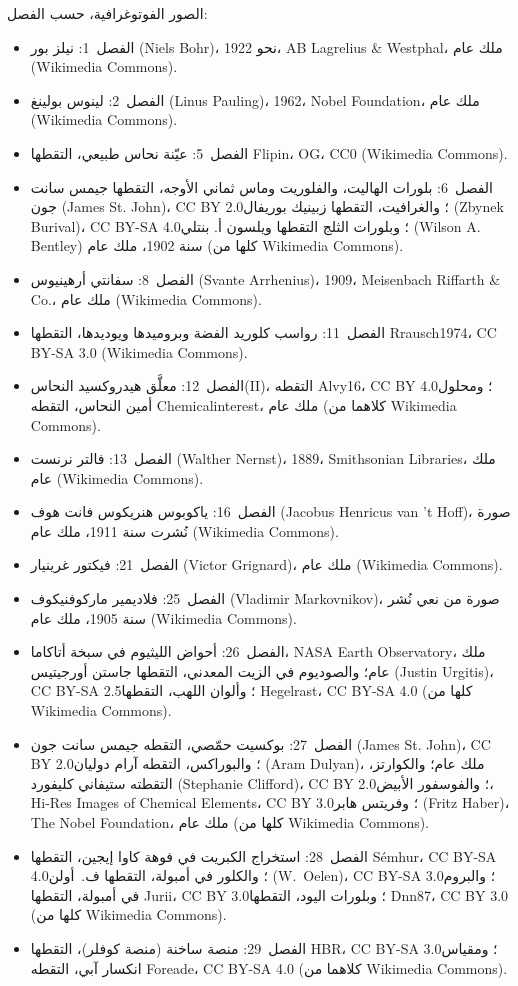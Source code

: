 \bigskip
\noindent الصور الفوتوغرافية، حسب الفصل:
\begin{itemize}\small
  \item الفصل~1: نيلز بور (Niels Bohr)، نحو 1922، AB Lagrelius \& Westphal، ملك عام
        (Wikimedia Commons).
  \item الفصل~2: لينوس بولينغ (Linus Pauling)، 1962، Nobel Foundation، ملك عام
        (Wikimedia Commons).
  \item الفصل~5: عيّنة نحاس طبيعي، التقطها Flipin، OG، CC0 (Wikimedia
        Commons).
  \item الفصل~6: بلورات الهاليت، والفلوريت وماس ثماني الأوجه، التقطها
        جيمس سانت جون (James St. John)، CC BY 2.0؛ والغرافيت، التقطها زبينيك بوريفال
        (Zbynek Burival)، CC BY-SA 4.0؛ وبلورات الثلج التقطها ويلسون أ. بنتلي
        (Wilson A. Bentley) سنة 1902، ملك عام (كلها من Wikimedia Commons).
  \item الفصل~8: سفانتي أرهينيوس (Svante Arrhenius)، 1909، Meisenbach Riffarth \& Co.، ملك
        عام (Wikimedia Commons).
  \item الفصل~11: رواسب كلوريد الفضة وبروميدها ويوديدها، التقطها
        Rrausch1974، CC BY-SA 3.0 (Wikimedia Commons).
  \item الفصل~12: معلَّق هيدروكسيد النحاس(II)، التقطه Alvy16، CC BY 4.0؛
        ومحلول أمين النحاس، التقطه Chemicalinterest، ملك عام (كلاهما من
        Wikimedia Commons).
  \item الفصل~13: فالتر نرنست (Walther Nernst)، 1889، Smithsonian Libraries، ملك عام
        (Wikimedia Commons).
  \item الفصل~16: ياكوبوس هنريكوس فانت هوف (Jacobus Henricus van 't Hoff)، صورة نُشرت سنة 1911،
        ملك عام (Wikimedia Commons).
  \item الفصل~21: فيكتور غرينيار (Victor Grignard)، ملك عام (Wikimedia Commons).
  \item الفصل~25: فلاديمير ماركوفنيكوف (Vladimir Markovnikov)، صورة من نعي
        نُشر سنة 1905، ملك عام (Wikimedia Commons).
  \item الفصل~26: أحواض الليثيوم في سبخة أتاكاما، NASA Earth
        Observatory، ملك عام؛ والصوديوم في الزيت المعدني، التقطها جاستن أورجيتيس (Justin Urgitis)،
        CC BY-SA 2.5؛ وألوان اللهب، التقطها Hegelrast، CC BY-SA 4.0 (كلها من
        Wikimedia Commons).
  \item الفصل~27: بوكسيت حمّصي، التقطه جيمس سانت جون (James St. John)، CC BY 2.0؛ والبوراكس، التقطه
        آرام دوليان (Aram Dulyan)، ملك عام؛ والكوارتز، التقطته ستيفاني كليفورد (Stephanie Clifford)، CC BY 2.0؛
        والفوسفور الأبيض، Hi-Res Images of Chemical Elements، CC BY 3.0؛
        وفريتس هابر (Fritz Haber)، The Nobel Foundation، ملك عام (كلها من Wikimedia
        Commons).
  \item الفصل~28: استخراج الكبريت في فوهة كاوا إيجين، التقطها Sémhur،
        CC BY-SA 4.0؛ والكلور في أمبولة، التقطها ف.~أولن (W.~Oelen)، CC BY-SA 3.0؛
        والبروم في أمبولة، التقطها Jurii، CC BY 3.0؛ وبلورات اليود، التقطها
        Dnn87، CC BY 3.0 (كلها من Wikimedia Commons).
  \item الفصل~29: منصة ساخنة (منصة كوفلر)، التقطها HBR، CC BY-SA 3.0؛ ومقياس انكسار
        آبي، التقطه Foreade، CC BY-SA 4.0 (كلاهما من Wikimedia Commons).
\end{itemize}
\clearpage
